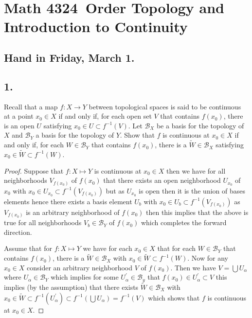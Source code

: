 \documentclass{amsart}
\theoremstyle{plain}
\theoremstyle{definition}
\theoremstyle{remark}
\begin{document}
\section*{Math 4324\  Order Topology and Introduction to Continuity } 

\subsection*{Hand in Friday, March 1.} 




\vspace{.15in}
\noindent
\subsection*{1.}  Recall that a map $f : X \rightarrow Y$ between topological spaces is said to be continuous at a point $x_0 \in X$ if and only if, for each open set $V$ that contains $f(x_0)$, there is an open $U$ satisfying $x_0 \in U \subset f^{-1}(V)$. Let $\mathcal B _X$ be a basis for the topology of $X$ and $\mathcal B _Y$ a basis for the topology of $Y$. Show that $f$ is continuous at $x_0 \in X$ if and only if, for each $W\in \mathcal B _Y$ that contains $f(x_0)$, there is a $\widetilde{W} \in \mathcal B _X$ satisfying $x_0 \in \widetilde{W} \subset f^{-1} (W)$. 


\begin{proof}
    Suppose that $f:X\mapsto Y$ is continuous at $x_0\in X$ then we have for all neighborhoods $V_{f(x_0)}$ of $f(x_0)$ that there exists an open neighborhood $U_{x_0}$ of $x_0$ with $x_0\in U_{x_0}\subset f^{-1}(V_{f(x_0)})$ but as $U_{x_0}$ is open then it is the union of bases elements hence there exists a basis element $U_{b}$ with $x_0\in U_{b}\subset f^{-1}(V_{f(x_0)})$ as $V_{f(x_0)}$ is an arbitrary neighborhood of $f(x_0)$ then this implies that the above is true for all neighborhoods $V_{b}\in \mathcal B_Y$ of $f(x_0)$ which completes the forward direction. 

    Assume that for $f:X\mapsto Y$ we have for each $x_0\in X$ that for each $W\in \mathcal B_Y$ that contains $f(x_0)$, there is a $\widetilde{W}\in \mathcal B_X$ with $x_0\in \widetilde{W} \subset f^{-1}(W)$. Now for any $x_0\in X$ consider an arbitrary neighborhood $V$ of $f(x_0)$. Then we have $V=\bigcup U_\alpha $ where $U_\alpha \in \mathcal B_Y $ which implies for some $U_\alpha ^\prime \in \mathcal B_y$ that $f(x_0)\in U_{\alpha}^\prime\subset V$ this implies (by the assumption) that there exists $\widetilde{W} \in \mathcal B_X$ with $x_0\in \widetilde{W}\subset  f^{-1}(U_{\alpha}^\prime)\subset f^{-1}(\bigcup U_\alpha)=f^{-1}(V)$ which shows that $f$ is continuous at $x_0\in X$.

\end{proof}
\end{document}

